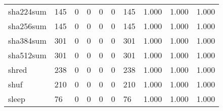 \begin{longtable}{lp{2.0cm}p{2.0cm}p{2.0cm}p{2.0cm}p{2.0cm}p{2.0cm}p{2.0cm}p{2.0cm}p{2.0cm}}
sha224sum &                    145 &                                             0 &                                            0 &                                           0 &                                            0 &                                        145 &                                1.000 &                                  1.000 &                                1.000 \\
sha256sum &                    145 &                                             0 &                                            0 &                                           0 &                                            0 &                                        145 &                                1.000 &                                  1.000 &                                1.000 \\
sha384sum &                    301 &                                             0 &                                            0 &                                           0 &                                            0 &                                        301 &                                1.000 &                                  1.000 &                                1.000 \\
sha512sum &                    301 &                                             0 &                                            0 &                                           0 &                                            0 &                                        301 &                                1.000 &                                  1.000 &                                1.000 \\
shred     &                    238 &                                             0 &                                            0 &                                           0 &                                            0 &                                        238 &                                1.000 &                                  1.000 &                                1.000 \\
shuf      &                    210 &                                             0 &                                            0 &                                           0 &                                            0 &                                        210 &                                1.000 &                                  1.000 &                                1.000 \\
sleep     &                     76 &                                             0 &                                            0 &                                           0 &                                            0 &                                         76 &                                1.000 &                                  1.000 &                                1.000 \\

\end{longtable}
